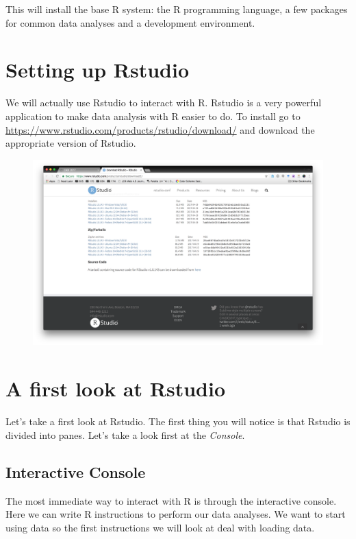 \documentclass[12pt,]{book}
\theoremstyle{definition}
\theoremstyle{definition}
\theoremstyle{definition}
\theoremstyle{remark}
\begin{document}
This will install the base R system: the R programming language, a few
packages for common data analyses and a development environment.

\section{Setting up Rstudio}\label{setting-up-rstudio}

We will actually use Rstudio to interact with R. Rstudio is a very
powerful application to make data analysis with R easier to do. To
install go to \url{https://www.rstudio.com/products/rstudio/download/}
and download the appropriate version of Rstudio.

\begin{figure}
\centering
\includegraphics{img/rstudio.png}
\caption{}
\end{figure}

\section{A first look at Rstudio}\label{a-first-look-at-rstudio}

Let's take a first look at Rstudio. The first thing you will notice is
that Rstudio is divided into panes. Let's take a look first at the
\emph{Console}.

\subsection{Interactive Console}\label{interactive-console}

The most immediate way to interact with R is through the interactive
console. Here we can write R instructions to perform our data analyses.
We want to start using data so the first instructions we will look at
deal with loading data.
\end{document}
